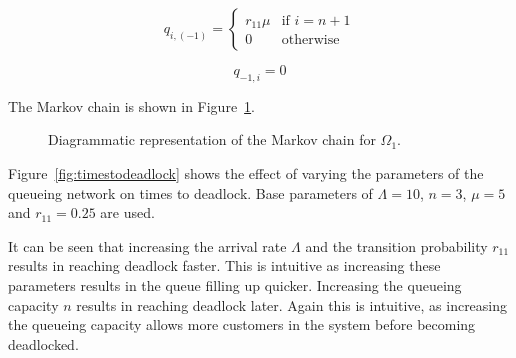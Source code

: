\documentclass{article}
\numberwithin{equation}{section}
\begin{document}
\begin{equation}\label{eqn:1nssB}
  q_{i, (-1)} = \left\{
  \begin{array}{rr}
    r_{11}\mu & \text{if } i = n + 1 \\
    0 & \text{otherwise}
  \end{array}
  \right.
\end{equation}

\begin{equation}\label{eqn:1nssC}
  q_{-1, i} = 0
\end{equation}

The Markov chain is shown in Figure~\ref{fig:1nodeMC}.

\begin{figure}[!htbp]
  \begin{center}
    
  \end{center}
  \caption{Diagrammatic representation of the Markov chain for $\Omega_1$.}
  \label{fig:1nodeMC}
\end{figure}

Figure~\ref{fig:timestodeadlock} shows the effect of varying the parameters of the queueing network on times to deadlock.
Base parameters of $\Lambda = 10$, $n = 3$, $\mu = 5$ and $r_{11} = 0.25$ are used.

It can be seen that increasing the arrival rate $\Lambda$ and the transition probability $r_{11}$ results in reaching deadlock faster.
This is intuitive as increasing these parameters results in the queue filling up quicker.
Increasing the queueing capacity $n$ results in reaching deadlock later.
Again this is intuitive, as increasing the queueing capacity allows more customers in the system before becoming deadlocked.
\end{document}
